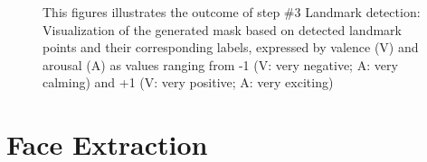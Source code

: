 \begin{figure}[htbp]
  \hfill
  \caption[ER pipeline step \#3: Mask]{This figures illustrates the outcome of step \#3 Landmark detection: Visualization of the generated mask based on detected landmark points and their corresponding labels, expressed by valence (V) and arousal (A) as values ranging from -1 (V: very negative; A: very calming) and +1 (V: very positive; A: very exciting)}
  \label{fig:MethodologyMask}
\end{figure}


\section{Face Extraction}

